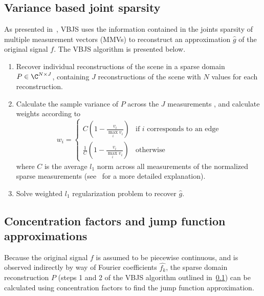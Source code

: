 \documentclass{article}
\begin{document}

\subsection{Variance based joint sparsity}\label{subsec:vbjs}

As presented in~\cite{gelb_2018}, VBJS uses the information contained in the joints sparsity of multiple measurement vectors (MMVs) to reconstruct an approximation $\hat{g}$ of the original signal $f$. The VBJS algorithm is presented below.

\begin{enumerate}
    \item Recover individual reconstructions of the scene in a sparse domain $P \in \C^{N\times J}$, containing $J$ reconstructions of the scene with $N$ values for each reconstruction.
    \item Calculate the sample variance of $P$ across the $J$ measurements%
    , and calculate weights according to
    \begin{equation}
        w_i = \begin{cases}
            C(1-\frac{v_i}{\max_i v_i}) & \text{if $i$ corresponds to an edge} \\
            \frac{1}{C}(1-\frac{v_i}{\max_i v_i}) & \text{otherwise}
    \end{cases}
    \end{equation}
    where $C$ is the average $l_1$ norm across all measurements of the normalized sparse measurements (see~\cite{gelb_2018} for a more detailed explanation).
    \item Solve weighted $l_1$ regularization problem to recover $\hat{g}$.
\end{enumerate}

\subsection{Concentration factors and jump function approximations}

Because the original signal $f$ is assumed to be piecewise continuous, and is observed indirectly by way of Fourier coefficients $\hat{f_k}$, the sparse domain reconstruction $P$ (steps 1 and 2 of the VBJS algorithm outlined in~\ref{subsec:vbjs}) can be calculated using concentration factors to find the jump function approximation.
\end{document}

